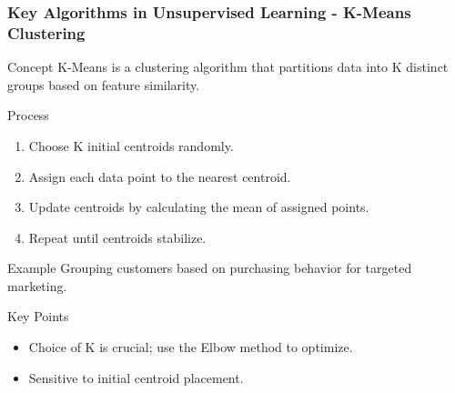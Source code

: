 \documentclass{beamer}
\begin{document}
\begin{frame}[fragile]
    \frametitle{Key Algorithms in Unsupervised Learning - K-Means Clustering}
    \begin{block}{Concept}
        K-Means is a clustering algorithm that partitions data into K distinct groups based on feature similarity.
    \end{block}
    \begin{block}{Process}
        \begin{enumerate}
            \item Choose K initial centroids randomly.
            \item Assign each data point to the nearest centroid.
            \item Update centroids by calculating the mean of assigned points.
            \item Repeat until centroids stabilize.
        \end{enumerate}
    \end{block}
    \begin{block}{Example}
        Grouping customers based on purchasing behavior for targeted marketing.
    \end{block}
    \begin{block}{Key Points}
        \begin{itemize}
            \item Choice of K is crucial; use the Elbow method to optimize.
            \item Sensitive to initial centroid placement.
        \end{itemize}
    \end{block}
\end{frame}
\end{document}
